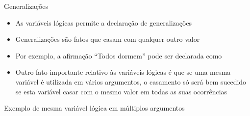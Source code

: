 \begin{frame}[fragile]{Generalizações}

    \begin{itemize}
        \item As variáveis lógicas permite a declaração de generalizações

        \item Generalizações são fatos que casam com qualquer outro valor 

        \item Por exemplo, a afirmação ``Todos dormem'' pode ser declarada como


        \item Outro fato importante relativo às variáveis lógicas é que se uma mesma variável
            é utilizada em vários argumentos, o casamento só será bem sucedido se esta variável
            casar com o mesmo valor em todas as suas ocorrências
    \end{itemize}

\end{frame}

\begin{frame}[fragile]{Exemplo de mesma variável lógica em múltiplos argumentos}


\end{frame}
